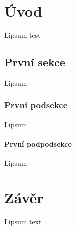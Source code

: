\documentclass[12pt]{report}
\begin{document}

\toc

\chapter{Úvod}
Lipsum test

\section{První sekce}
Lipsum

\subsection{První podsekce}
Lipsum

\subsubsection{První podpodsekce}
Lipsum



\chapter{Závěr}
Lipsum text \cite{template}

\printbibliography
\end{document}
